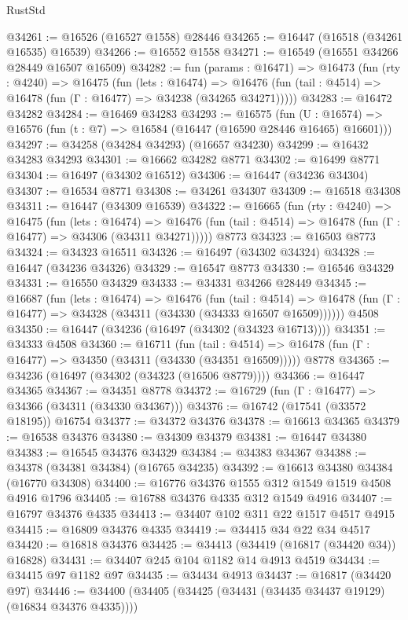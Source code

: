 \begin{lexlean}{RustStd}
\begin{coremodule}
{\begin{coremodule}
{{{{{{{{{{{{{{{{{{{{{{{{{{{{{{{{{{{{{{{{{{{{{{{{{{{{{{{@34261 := @16526 (@16527 @1558) @28446
@34265 := @16447 (@16518 (@34261 @16535) @16539)
@34266 := @16552 @1558
@34271 := @16549 (@16551 @34266 @28449 @16507 @16509)
@34282 := fun (params : @16471) =>
  @16473
    (fun (rty : @4240) =>
    @16475
      (fun (lets : @16474) =>
      @16476 (fun (tail : @4514) => @16478 (fun (Γ : @16477) => @34238 (@34265 @34271)))))
@34283 := @16472 @34282
@34284 := @16469 @34283
@34293 := @16575
    (fun (U : @16574) => @16576 (fun (t : @7) => @16584 (@16447 (@16590 @28446 @16465) @16601)))
@34297 := @34258 (@34284 @34293) (@16657 @34230)
@34299 := @16432 @34283 @34293
@34301 := @16662 @34282 @8771
@34302 := @16499 @8771
@34304 := @16497 (@34302 @16512)
@34306 := @16447 (@34236 @34304)
@34307 := @16534 @8771
@34308 := @34261 @34307
@34309 := @16518 @34308
@34311 := @16447 (@34309 @16539)
@34322 := @16665
    (fun (rty : @4240) =>
    @16475
      (fun (lets : @16474) =>
      @16476 (fun (tail : @4514) => @16478 (fun (Γ : @16477) => @34306 (@34311 @34271)))))
    @8773
@34323 := @16503 @8773
@34324 := @34323 @16511
@34326 := @16497 (@34302 @34324)
@34328 := @16447 (@34236 @34326)
@34329 := @16547 @8773
@34330 := @16546 @34329
@34331 := @16550 @34329
@34333 := @34331 @34266 @28449
@34345 := @16687
    (fun (lets : @16474) =>
    @16476
      (fun (tail : @4514) =>
      @16478 (fun (Γ : @16477) => @34328 (@34311 (@34330 (@34333 @16507 @16509))))))
    @4508
@34350 := @16447 (@34236 (@16497 (@34302 (@34323 @16713))))
@34351 := @34333 @4508
@34360 := @16711
    (fun (tail : @4514) => @16478 (fun (Γ : @16477) => @34350 (@34311 (@34330 (@34351 @16509)))))
    @8778
@34365 := @34236 (@16497 (@34302 (@34323 (@16506 @8779))))
@34366 := @16447 @34365
@34367 := @34351 @8778
@34372 := @16729 (fun (Γ : @16477) => @34366 (@34311 (@34330 @34367)))
@34376 := @16742 (@17541 (@33572 @18195)) @16754
@34377 := @34372 @34376
@34378 := @16613 @34365
@34379 := @16538 @34376
@34380 := @34309 @34379
@34381 := @16447 @34380
@34383 := @16545 @34376 @34329
@34384 := @34383 @34367
@34388 := @34378 (@34381 @34384) (@16765 @34235)
@34392 := @16613 @34380 @34384 (@16770 @34308)
@34400 := @16776 @34376 @1555 @312 @1549 @1519 @4508 @4916 @1796
@34405 := @16788 @34376 @4335 @312 @1549 @4916
@34407 := @16797 @34376 @4335
@34413 := @34407 @102 @311 @22 @1517 @4517 @4915
@34415 := @16809 @34376 @4335
@34419 := @34415 @34 @22 @34 @4517
@34420 := @16818 @34376
@34425 := @34413 (@34419 (@16817 (@34420 @34)) @16828)
@34431 := @34407 @245 @104 @1182 @14 @4913 @4519
@34434 := @34415 @97 @1182 @97
@34435 := @34434 @4913
@34437 := @16817 (@34420 @97)
@34446 := @34400 (@34405 (@34425 (@34431 (@34435 @34437 @19129) (@16834 @34376 @4335))))
}}}}}}}}}}}}}}}}}}}}}}}}}}}}}}}}}}}}}}}}}}}}}}}}}}}}}}}
\end{coremodule}}
\end{coremodule}
\end{lexlean}
